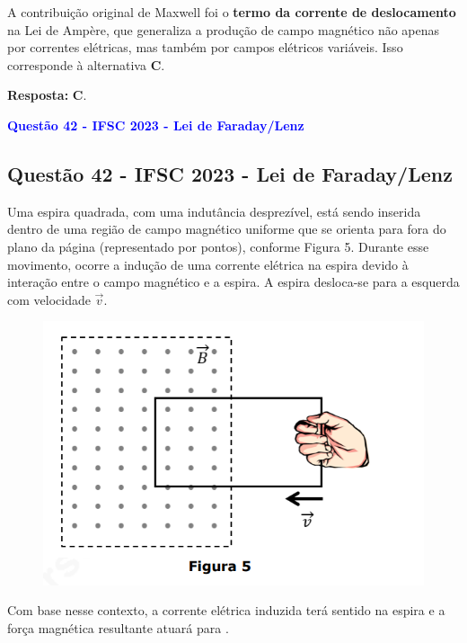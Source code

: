\begin{flushleft}
A contribui\c{c}\~ao original de Maxwell foi o \textbf{termo da corrente de deslocamento} na Lei de Amp\`ere, que generaliza a produ\c{c}\~ao de campo magn\'etico n\~ao apenas por correntes el\'etricas, mas tamb\'em por campos el\'etricos vari\'aveis. Isso corresponde \`a alternativa \textbf{C}.

\vspace{0.3cm}
\textbf{Resposta:} \colorbox{green!50}{\textbf{C}}.
\end{flushleft}

\begin{flushleft}
\textbf{\textcolor{blue}{\Large Quest\~ao 42 - IFSC 2023 - Lei de Faraday/Lenz}}\\
\noindent

\subsection{Quest\~ao 42 - IFSC 2023 - Lei de Faraday/Lenz}
Uma espira quadrada, com uma indutância desprezível, está sendo inserida dentro de uma região de campo magnético uniforme que se orienta 
para fora do plano da página (representado por pontos), conforme Figura 5. Durante esse movimento, ocorre a indução de uma corrente elétrica 
na espira devido à interação entre o campo magnético e a espira. A espira desloca-se para a esquerda com velocidade $\vec{v}$.

\begin{figure}
\centering
\includegraphics[scale=0.5]{figures/lei-faraday-lenz.png}
\end{figure}

Com base nesse contexto, a corrente elétrica induzida terá sentido \underline{\hspace{2cm}} na espira e a força magnética resultante atuará 
para \underline{\hspace{2cm}}.


\end{flushleft}
